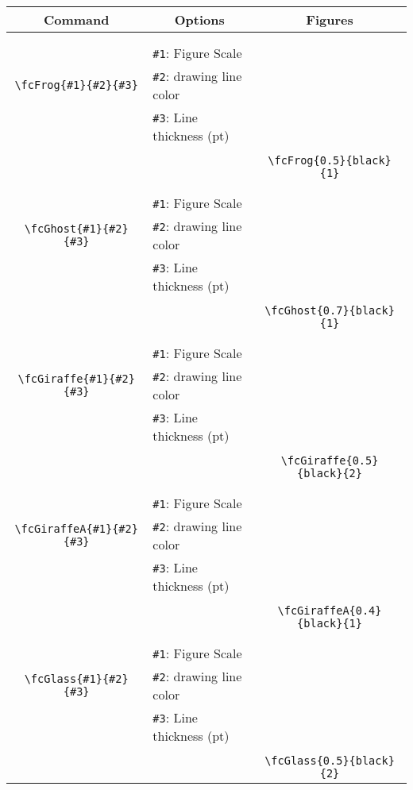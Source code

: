 \documentclass[x11names]{article}
\begin{document}
\begin{table}[H]\centering\begin{tabular}{|c|l|c|}\hline {\bf Command}& \multicolumn{1}{c|}{{\bf Options}} & {\bf Figures}\\  \hline	&&\multirow{5}{*}{\fcFrog{0.5}{black}{1}}\\	&&\\	&\verb|#1|: Figure Scale &\\	\verb|\fcFrog{#1}{#2}{#3}|&	\verb|#2|: drawing line color &\\	&\verb|#3|: Line thickness (pt) &\\ &&\\&&	\verb|\fcFrog{0.5}{black}{1}|\\\hline 	
	&&\multirow{5}{*}{\fcGhost{0.7}{black}{1}}\\	&&\\	&\verb|#1|: Figure Scale &\\	\verb|\fcGhost{#1}{#2}{#3}|&	\verb|#2|: drawing line color &\\	&\verb|#3|: Line thickness (pt) &\\ &&\\&&	\verb|\fcGhost{0.7}{black}{1}|\\\hline 	
	&&\multirow{5}{*}{\fcGiraffe{0.5}{black}{2}}\\	&&\\	&\verb|#1|: Figure Scale &\\	\verb|\fcGiraffe{#1}{#2}{#3}|&	\verb|#2|: drawing line color &\\	&\verb|#3|: Line thickness (pt) &\\ &&\\&&	\verb|\fcGiraffe{0.5}{black}{2}|\\\hline 	
	&&\multirow{5}{*}{\fcGiraffeA{0.4}{black}{1}}\\	&&\\	&\verb|#1|: Figure Scale &\\	\verb|\fcGiraffeA{#1}{#2}{#3}|&	\verb|#2|: drawing line color &\\	&\verb|#3|: Line thickness (pt) &\\ &&\\&&	\verb|\fcGiraffeA{0.4}{black}{1}|\\\hline 	
	&&\multirow{5}{*}{\fcGlass{0.5}{black}{2}}\\	&&\\	&\verb|#1|: Figure Scale &\\	\verb|\fcGlass{#1}{#2}{#3}|&	\verb|#2|: drawing line color &\\	&\verb|#3|: Line thickness (pt) &\\ &&\\&&	\verb|\fcGlass{0.5}{black}{2}|\\\hline 	

\end{tabular}
\end{table}
\end{document}
